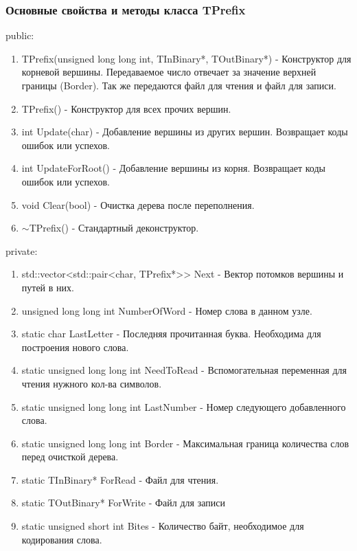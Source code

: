 \documentclass[12pt]{article}
\begin{document}
\subsubsection*{Основные свойства и методы класса TPrefix}

\noindent
public:

\begin{enumerate}
	\item TPrefix(unsigned long long int, TInBinary*, TOutBinary*) - Конструктор для корневой вершины. Передаваемое число отвечает за значение верхней границы (Border). Так же передаются файл для чтения и файл для записи.
	\item TPrefix() - Конструктор для всех прочих вершин.
	\item int Update(char) - Добавление вершины из других вершин. Возвращает коды ошибок или успехов.
	\item int UpdateForRoot() - Добавление вершины из корня. Возвращает коды ошибок или успехов.
	\item void Clear(bool) - Очистка дерева после переполнения.
	\item $\sim$TPrefix() - Стандартный деконструктор.
\end{enumerate}
\noindent
private:

\begin{enumerate}
	\item std::vector<std::pair<char, TPrefix*>\hspace{0pt}> Next - Вектор потомков вершины и путей в них.
	\item unsigned long long int NumberOfWord - Номер слова в данном узле.
	\item static char LastLetter - Последняя прочитанная буква. Необходима для построения нового слова.
	\item static unsigned long long int NeedToRead - Вспомогательная переменная для чтения нужного кол-ва символов.
	\item static unsigned long long int LastNumber - Номер следующего добавленного слова.
	\item static unsigned long long int Border - Максимальная граница количества слов перед очисткой дерева.
	\item static TInBinary* ForRead - Файл для чтения.
	\item static TOutBinary* ForWrite - Файл для записи
	\item static unsigned short int Bites - Количество байт, необходимое для кодирования слова.
\end{enumerate}
\end{document}
